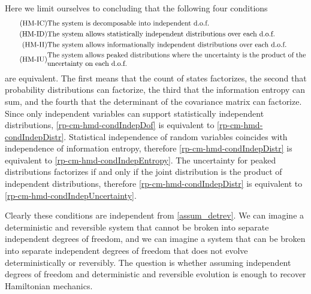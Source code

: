 Here we limit ourselves to concluding that the following four conditions
\begin{align}
	\tag{HM-IC}\label{rp-cm-hmd-condIndepDof}
	&\text{The system is decomposable into independent d.o.f.} \\
	\tag{HM-ID}\label{rp-cm-hmd-condIndepDistr}
	&\text{The system allows statistically independent distributions over each d.o.f.} \\
	\tag{HM-II}\label{rp-cm-hmd-condIndepEntropy}
	&\text{The system allows informationally independent distributions over each d.o.f.} \\
	\tag{HM-IU}\label{rp-cm-hmd-condIndepUncertainty}
	&\parbox{5in}{The system allows peaked distributions where the uncertainty is the product of the uncertainty on each d.o.f.}
\end{align}
are equivalent. The first means that the count of states factorizes, the second that probability distributions can factorize, the third that the information entropy can sum, and the fourth that the determinant of the covariance matrix can factorize. Since only independent variables can support statistically independent distributions, \ref{rp-cm-hmd-condIndepDof} is equivalent to \ref{rp-cm-hmd-condIndepDistr}. Statistical independence of random variables coincides with independence of information entropy, therefore \ref{rp-cm-hmd-condIndepDistr} is equivalent to \ref{rp-cm-hmd-condIndepEntropy}. The uncertainty for peaked distributions factorizes if and only if the joint distribution is the product of independent distributions, therefore  \ref{rp-cm-hmd-condIndepDistr} is equivalent to \ref{rp-cm-hmd-condIndepUncertainty}.

Clearly these conditions are independent from \ref{assum_detrev}. We can imagine a deterministic and reversible system that cannot be broken into separate independent degrees of freedom, and we can imagine a system that can be broken into separate independent degrees of freedom that does not evolve deterministically or reversibly. The question is whether assuming independent degrees of freedom and deterministic and reversible evolution is enough to recover Hamiltonian mechanics. 

